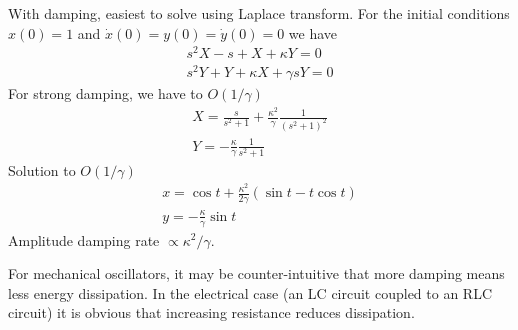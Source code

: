 \documentclass[12pt,aps,prb,preprint]{revtex4}
\def\X{{\bf X}}
\begin{document}
With damping, easiest to solve using Laplace transform. For the
initial conditions $x(0)=1$ and $\dot x(0) = y(0) = \dot y(0) = 0$ we
have
\begin{equation}
\begin{array}{l}
s^2 X - s + X + \kappa Y = 0 \\
s^2 Y + Y + \kappa X + \gamma s Y = 0
\end{array}
\end{equation}
For strong damping, we have to $O(1/\gamma)$
\begin{equation}
\begin{array}{l}
\displaystyle
X = \frac s{s^2+1} + \frac{\kappa^2}\gamma \frac1{(s^2+1)^2} \\
\displaystyle
Y = -\frac\kappa\gamma \frac1{s^2+1}
\end{array}
\end{equation}
Solution to $O(1/\gamma)$
\begin{equation}
\begin{array}{l}
\displaystyle
x = \cos t + \frac{\kappa^2}{2\gamma} (\sin t - t\cos t) \\
\displaystyle
y = -\frac\kappa\gamma \sin t
\end{array}
\end{equation}
Amplitude damping rate $\propto\kappa^2/\gamma$.

For mechanical oscillators, it may be counter-intuitive that more
damping means less energy dissipation.  In the electrical case (an LC
circuit coupled to an RLC circuit) it is obvious that increasing
resistance reduces dissipation.



\newpage

\def\zero{{\bf 0}}
\def\vmargin{\hrule height 1cm width 0pt}

\def\pgfbeamsplitter(#1,#2){\pgfputat{\pgfxy(#1,#2)}
                            {\pgfbox[center,center]
                             {$e^{i\alpha\X}$}
                            \pgfxyline(-.8,0)(0,.8)
                            \pgfxyline(0,.8)(.8,0)
                            \pgfxyline(.8,0)(0,-.8)
                            \pgfxyline(0,-.8)(-.8,0)}}

\def\pgfmirror(#1,#2){\pgfputat{\pgfxy(#1,#2)}
                      {\pgfbox[center,center]{$\X$}
                      \pgfxyline(-.4,-.4)(.4,-.4)
                      \pgfxyline(.4,-.4)(.4,.4)
                      \pgfxyline(.4,.4)(-.4,.4)
                      \pgfxyline(-.4,.4)(-.4,-.4)}}
\end{document}
